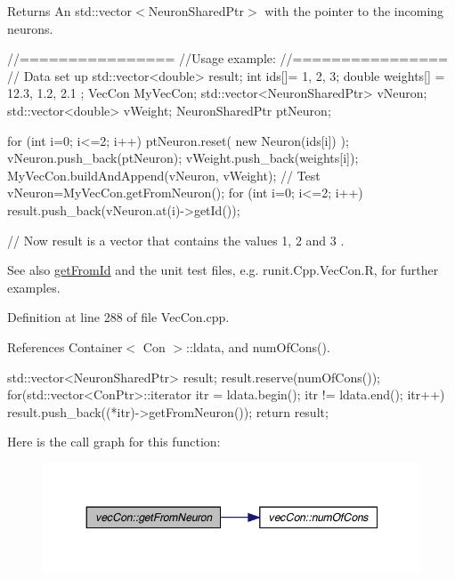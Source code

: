 \begin{DoxyReturn}{Returns}
An std::vector$<$NeuronSharedPtr$>$ with the pointer to the incoming neurons.
\end{DoxyReturn}

\begin{DoxyCode}
        //================
        //Usage example:
        //================
        // Data set up
                std::vector<double> result;
                int ids[]= {1, 2, 3};
                double weights[] = {12.3, 1.2, 2.1 };
                VecCon MyVecCon;
                std::vector<NeuronSharedPtr> vNeuron;
                std::vector<double> vWeight;
                NeuronSharedPtr ptNeuron;

                        for (int i=0; i<=2; i++) {
                                ptNeuron.reset( new Neuron(ids[i]) );
                                vNeuron.push_back(ptNeuron);
                                vWeight.push_back(weights[i]);
                        }
                        MyVecCon.buildAndAppend(vNeuron, vWeight);
                // Test
                        vNeuron=MyVecCon.getFromNeuron();
                        for (int i=0; i<=2; i++) {
                                result.push_back(vNeuron.at(i)->getId());
                        }

        // Now result is a vector that contains the values 1, 2 and 3 .
\end{DoxyCode}


\begin{DoxySeeAlso}{See also}
\hyperlink{classvec_con_aa9f3f5df4c4060951c975c4c829b8471}{getFromId} and the unit test files, e.g. runit.Cpp.VecCon.R, for further examples. 
\end{DoxySeeAlso}


Definition at line 288 of file VecCon.cpp.



References Container$<$ Con $>$::ldata, and numOfCons().


\begin{DoxyCode}
                                                    {
        std::vector<NeuronSharedPtr> result;
        result.reserve(numOfCons());
        for(std::vector<ConPtr>::iterator itr = ldata.begin();   itr != 
      ldata.end();   itr++)   {
                result.push_back((*itr)->getFromNeuron());
        }
        return result;
}
\end{DoxyCode}


Here is the call graph for this function:\nopagebreak
\begin{figure}[H]
\begin{center}
\leavevmode
\includegraphics[width=348pt]{classvec_con_ae72d00aedcd054e690f1dcf2ca5ac2c2_cgraph}
\end{center}
\end{figure}


